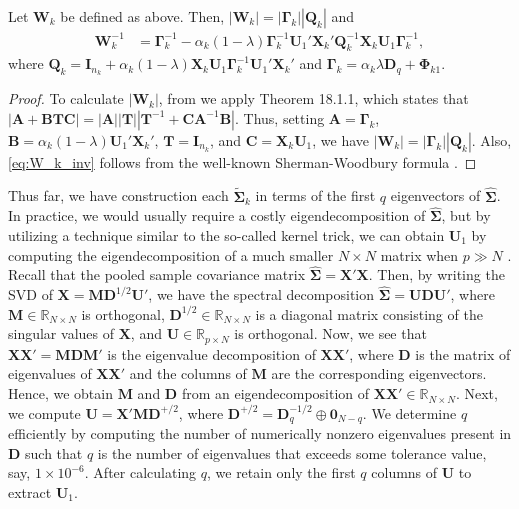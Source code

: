 \documentclass[11pt]{article}
\begin{document}
\begin{proposition}\label{proposition:rda-W_k}
Let $\bm W_k$ be defined as above. Then, $|\bm W_k| = |\bm \Gamma_k| |\bm Q_k|$ and
	\begin{align}
		\bm W_k^{-1} &= \bm \Gamma_k^{-1} - \alpha_k(1 - \lambda) \bm \Gamma_k^{-1} \bm U_1' \bm X_k' \bm Q_k^{-1} \bm X_k \bm U_1 \bm \Gamma_k^{-1},\label{eq:W_k_inv}
	\end{align}
where $\bm Q_k = \bm I_{n_k} + \alpha_k(1- \lambda) \bm X_k \bm U_1 \bm \Gamma_k^{-1} \bm U_1' \bm X_k'$ and $\bm \Gamma_k = \alpha_k \lambda \bm D_q + \bm \Phi_{k1}$.
\end{proposition}
\begin{proof}
	To calculate $|\bm W_k|$, from \cite{Harville:2008wja} we apply Theorem 18.1.1, which states that $|\bm A + \bm B \bm T \bm C| = |\bm A| |\bm T| |\bm T^{-1} + \bm C \bm A^{-1} \bm B|$. Thus, setting $\bm A = \bm \Gamma_k$, $\bm B = \alpha_k (1 - \lambda) \bm U_1' \bm X_k'$, $\bm T = \bm I_{n_k}$, and $\bm C = \bm X_k \bm U_1$, we have $|\bm W_k| = |\bm \Gamma_k| |\bm Q_k|$. Also,  \eqref{eq:W_k_inv} follows from the well-known Sherman-Woodbury formula \citep[Theorem 18.2.8]{Harville:2008wja}.
\end{proof}

Thus far, we have construction each $\tilde{\bm \Sigma}_k$ in terms of the first $q$ eigenvectors of $\widehat{\bm \Sigma}$. In practice, we would usually require a costly eigendecomposition of $\widehat{\bm \Sigma}$, but by utilizing a technique similar to the so-called kernel trick, we can obtain $\bm U_1$ by computing the eigendecomposition of a much smaller $N \times N$ matrix when $p \gg N$ \citep{Hastie:2008dt}. Recall that the pooled sample covariance matrix $\widehat{\bm\Sigma} = \bm X' \bm X$. Then, by writing the SVD of $\bm X = \bm M \bm D^{1/2} \bm U'$, we have the spectral decomposition $\widehat{\bm\Sigma} = \bm U \bm D \bm U'$, where $\bm M \in \mathbb{R}_{N \times N}$ is orthogonal, $\bm D^{1/2} \in \mathbb{R}_{N \times N}$ is a diagonal matrix consisting of the singular values of $\bm X$, and $\bm U \in \mathbb{R}_{p \times N}$ is orthogonal. Now, we see that $\bm X \bm X' = \bm M \bm D \bm M'$ is the eigenvalue decomposition of $\bm X \bm X'$, where $\bm D$ is the matrix of eigenvalues of $\bm X \bm X'$ and the columns of $\bm M$  are the corresponding eigenvectors. Hence, we obtain $\bm M$ and $\bm D$ from an eigendecomposition of $\bm X \bm X' \in \mathbb{R}_{N \times N}$. Next, we compute $\bm U = \bm X' \bm M \bm D^{+/2}$, where $\bm D^{+/2} = \bm D_q^{-1/2} \oplus \bm 0_{N-q}$. We determine $q$ efficiently by computing the number of numerically nonzero eigenvalues present in $\bm D$ such that $q$ is the number of eigenvalues that exceeds some tolerance value, say, $1 \times 10^{-6}$. After calculating $q$, we retain only the first $q$ columns of $\bm U$ to extract $\bm U_1$.
\end{document}
